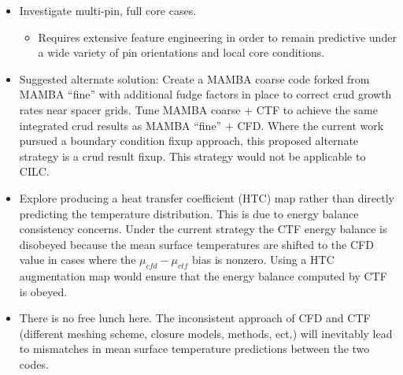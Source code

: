 \begin{itemize}
	\item  Investigate multi-pin, full core cases.
	\begin{itemize}
		\item Requires extensive feature engineering in order to remain predictive under a wide variety of pin orientations and local core conditions.
	\end{itemize}
	\item Suggested alternate solution:  Create a MAMBA coarse code forked from MAMBA ``fine'' with additional fudge factors in place to correct crud growth rates near spacer grids.  Tune MAMBA coarse + CTF to achieve the same integrated crud results as MAMBA ``fine'' + CFD.  Where the current work pursued a boundary condition fixup approach, this proposed alternate strategy is a crud result fixup.   This strategy would not be applicable to CILC.
        \item Explore producing a heat transfer coefficient (HTC) map rather than directly predicting the temperature distribution.  This is due to energy balance consistency concerns.  Under the current strategy the CTF energy balance is disobeyed because the mean surface temperatures are shifted to the CFD value in cases where the $\mu_{cfd}-\mu_{ctf}$ bias is nonzero.  Using a HTC augmentation map would ensure that the energy balance computed by CTF is obeyed.
	\item There is no free lunch here.  The inconsistent approach of CFD and CTF (different meshing scheme, closure models, methods, ect.) will inevitably lead to mismatches in mean surface temperature predictions between the two codes.
	
\end{itemize}
